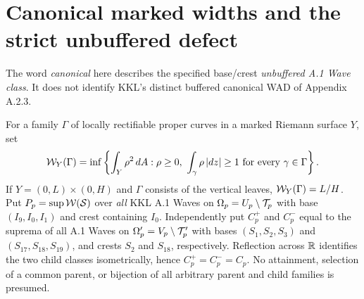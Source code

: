 \section{Canonical marked widths and the strict unbuffered defect}
\label{sec:wave-proofs}
The word \emph{canonical} here describes the
specified base/crest \emph{unbuffered A.1 Wave class}.
It does not identify KKL's distinct
buffered canonical WAD of Appendix A.2.3.

\begin{definition}
For a family $\Gamma$ of locally rectifiable proper
curves in a marked Riemann surface $Y$, set
\begin{equation}\label{eq:width}
 \mathcal W_Y(\Gamma)=
 \inf\left\{\int_Y\rho^2\,dA:
    \rho\ge0,\ \int_\gamma\rho\,|dz|\ge1
       \text{ for every }\gamma\in\Gamma\right\}.
\end{equation}
If $Y=(0,L)\times(0,H)$ and $\Gamma$ consists
of the vertical leaves, $\mathcal W_Y(\Gamma)=L/H$.
Put $P_p=\sup\mathcal W(\mathcal S)$ over \emph{all}
KKL A.1 Waves on $\Omega_p=U_p\setminus\mathcal T_p$
with base $(I_9,I_0,I_1)$ and crest
containing $I_0$.  Independently put
$C_p^+$ and $C_p^-$ equal to the suprema
of all A.1 Waves on
$\Omega'_p=V_p\setminus\mathcal T'_p$
with bases $(S_1,S_2,S_3)$ and
$(S_{17},S_{18},S_{19})$, and crests
$S_2$ and $S_{18}$, respectively.
Reflection across $\mathbb R$ identifies
the two child classes isometrically,
hence $C_p^+=C_p^-=C_p$.
No attainment, selection of a
common parent, or bijection of
all arbitrary parent and child
families is presumed.
\end{definition}

